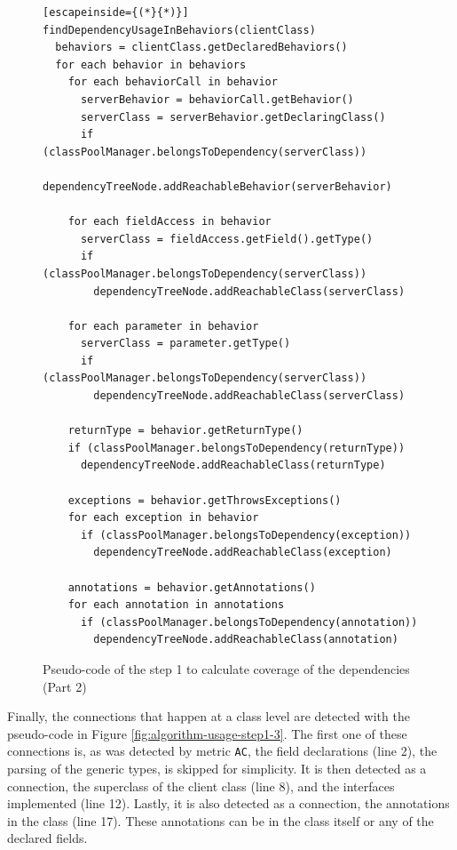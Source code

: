 \begin{figure}[ht!]
\begin{lstlisting}[escapeinside={(*}{*)}]
findDependencyUsageInBehaviors(clientClass)
  behaviors = clientClass.getDeclaredBehaviors()
  for each behavior in behaviors
    for each behaviorCall in behavior
      serverBehavior = behaviorCall.getBehavior()
      serverClass = serverBehavior.getDeclaringClass()
      if (classPoolManager.belongsToDependency(serverClass))
        dependencyTreeNode.addReachableBehavior(serverBehavior)

    for each fieldAccess in behavior
      serverClass = fieldAccess.getField().getType()
      if (classPoolManager.belongsToDependency(serverClass))
        dependencyTreeNode.addReachableClass(serverClass)

    for each parameter in behavior
      serverClass = parameter.getType()
      if (classPoolManager.belongsToDependency(serverClass))
        dependencyTreeNode.addReachableClass(serverClass)

    returnType = behavior.getReturnType()
    if (classPoolManager.belongsToDependency(returnType))
      dependencyTreeNode.addReachableClass(returnType)

    exceptions = behavior.getThrowsExceptions()
    for each exception in behavior
      if (classPoolManager.belongsToDependency(exception))
        dependencyTreeNode.addReachableClass(exception)

    annotations = behavior.getAnnotations()
    for each annotation in annotations
      if (classPoolManager.belongsToDependency(annotation))
        dependencyTreeNode.addReachableClass(annotation)
\end{lstlisting}
\caption{Pseudo-code of the step 1 to calculate coverage of the dependencies (Part 2)}
\label{fig:algorithm-usage-step1-2}
\end{figure}

Finally, the connections that happen at a class level are detected with the pseudo-code in Figure \ref{fig:algorithm-usage-step1-3}. The first one of these connections is, as was detected by metric \texttt{AC}, the field declarations (line 2), the parsing of the generic types, is skipped for simplicity. It is then detected as a connection, the superclass of the client class (line 8), and the interfaces implemented (line 12). Lastly, it is also detected as a connection, the annotations in the class (line 17). These annotations can be in the class itself or any of the declared fields.

